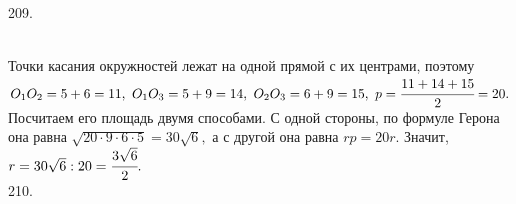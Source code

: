 \documentclass[12pt]{article}
\begin{document}
209. \begin{figure}[ht!]
\end{figure}\\
Точки касания окружностей лежат на одной прямой с их центрами, поэтому $O_1O_2=5+6=11,\ O_1O_3=5+9=14,\ O_2O_3=6+9=15,\ p=\cfrac{11+14+15}{2}=20.$ Посчитаем его площадь двумя способами. С одной стороны, по формуле Герона она равна $\sqrt{20\cdot9\cdot6\cdot5}=30\sqrt{6},$ а с другой она равна $rp=20r.$ Значит, $r=30\sqrt{6}:20=\cfrac{3\sqrt{6}}{2}.$\\
210. \begin{figure}[ht!]
\end{figure}\\
\end{document}
